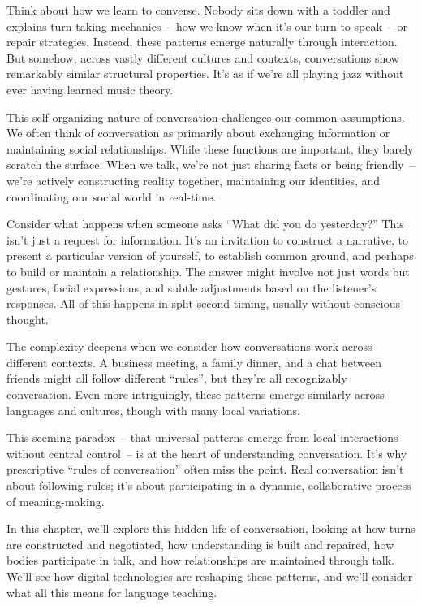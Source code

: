 Think about how we learn to converse. Nobody sits down with a toddler and explains turn-taking mechanics~-- how we know when it's our turn to speak~-- or repair strategies. Instead, these patterns emerge naturally through interaction. But somehow, across vastly different cultures and contexts, conversations show remarkably similar structural properties. It's as if we're all playing jazz without ever having learned music theory.

This self-organizing nature of conversation challenges our common assumptions. We often think of conversation as primarily about exchanging information or maintaining social relationships. While these functions are important, they barely scratch the surface. When we talk, we're not just sharing facts or being friendly~-- we're actively constructing reality together, maintaining our identities, and coordinating our social world in real-time.

Consider what happens when someone asks ``What did you do yesterday?'' This isn't just a request for information. It's an invitation to construct a narrative, to present a particular version of yourself, to establish common ground, and perhaps to build or maintain a relationship. The answer might involve not just words but gestures, facial expressions, and subtle adjustments based on the listener's responses. All of this happens in split-second timing, usually without conscious thought.

The complexity deepens when we consider how conversations work across different contexts. A business meeting, a family dinner, and a chat between friends might all follow different ``rules'', but they're all recognizably conversation. Even more intriguingly, these patterns emerge similarly across languages and cultures, though with many local variations.

This seeming paradox~-- that universal patterns emerge from local interactions without central control~-- is at the heart of understanding conversation. It's why prescriptive ``rules of conversation'' often miss the point. Real conversation isn't about following rules; it's about participating in a dynamic, collaborative process of meaning-making.

In this chapter, we'll explore this hidden life of conversation, looking at how turns are constructed and negotiated, how understanding is built and repaired, how bodies participate in talk, and how relationships are maintained through talk. We'll see how digital technologies are reshaping these patterns, and we'll consider what all this means for language teaching.


